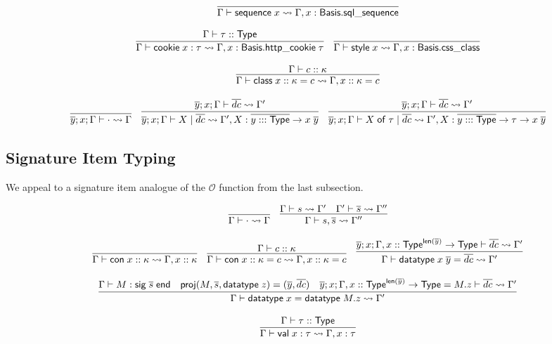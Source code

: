\documentclass{article}
\newcommand{\mt}[1]{\mathsf{#1}}
\begin{document}
$$\infer{\Gamma \vdash \mt{sequence} \; x \leadsto \Gamma, x : \mt{Basis}.\mt{sql\_sequence}}{}$$

$$\infer{\Gamma \vdash \mt{cookie} \; x : \tau \leadsto \Gamma, x : \mt{Basis}.\mt{http\_cookie} \; \tau}{
  \Gamma \vdash \tau :: \mt{Type}
}
\quad \infer{\Gamma \vdash \mt{style} \; x \leadsto \Gamma, x : \mt{Basis}.\mt{css\_class}}{}$$

$$\infer{\Gamma \vdash \mt{class} \; x :: \kappa = c \leadsto \Gamma, x :: \kappa = c}{
  \Gamma \vdash c :: \kappa
}$$

$$\infer{\overline{y}; x; \Gamma \vdash \cdot \leadsto \Gamma}{}
\quad \infer{\overline{y}; x; \Gamma \vdash X \mid \overline{dc} \leadsto \Gamma', X : \overline{y ::: \mt{Type}} \to x \; \overline{y}}{
  \overline{y}; x; \Gamma \vdash \overline{dc} \leadsto \Gamma'
}
\quad \infer{\overline{y}; x; \Gamma \vdash X \; \mt{of} \; \tau \mid \overline{dc} \leadsto \Gamma', X : \overline{y ::: \mt{Type}} \to \tau \to x \; \overline{y}}{
  \overline{y}; x; \Gamma \vdash \overline{dc} \leadsto \Gamma'
}$$

\subsection{Signature Item Typing}

We appeal to a signature item analogue of the $\mathcal O$ function from the last subsection.

$$\infer{\Gamma \vdash \cdot \leadsto \Gamma}{}
\quad \infer{\Gamma \vdash s, \overline{s} \leadsto \Gamma''}{
  \Gamma \vdash s \leadsto \Gamma'
  & \Gamma' \vdash \overline{s} \leadsto \Gamma''
}$$

$$\infer{\Gamma \vdash \mt{con} \; x :: \kappa \leadsto \Gamma, x :: \kappa}{}
\quad \infer{\Gamma \vdash \mt{con} \; x :: \kappa = c \leadsto \Gamma, x :: \kappa = c}{
  \Gamma \vdash c :: \kappa
}
\quad \infer{\Gamma \vdash \mt{datatype} \; x \; \overline{y} = \overline{dc} \leadsto \Gamma'}{
  \overline{y}; x; \Gamma, x :: \mt{Type}^{\mt{len}(\overline y)} \to \mt{Type} \vdash \overline{dc} \leadsto \Gamma'
}$$

$$\infer{\Gamma \vdash \mt{datatype} \; x = \mt{datatype} \; M.z \leadsto \Gamma'}{
  \Gamma \vdash M : \mt{sig} \; \overline{s} \; \mt{end}
  & \mt{proj}(M, \overline{s}, \mt{datatype} \; z) = (\overline{y}, \overline{dc})
  & \overline{y}; x; \Gamma, x :: \mt{Type}^{\mt{len}(\overline y)} \to \mt{Type} = M.z \vdash \overline{dc} \leadsto \Gamma'
}$$

$$\infer{\Gamma \vdash \mt{val} \; x : \tau \leadsto \Gamma, x : \tau}{
  \Gamma \vdash \tau :: \mt{Type}
}$$
\end{document}
